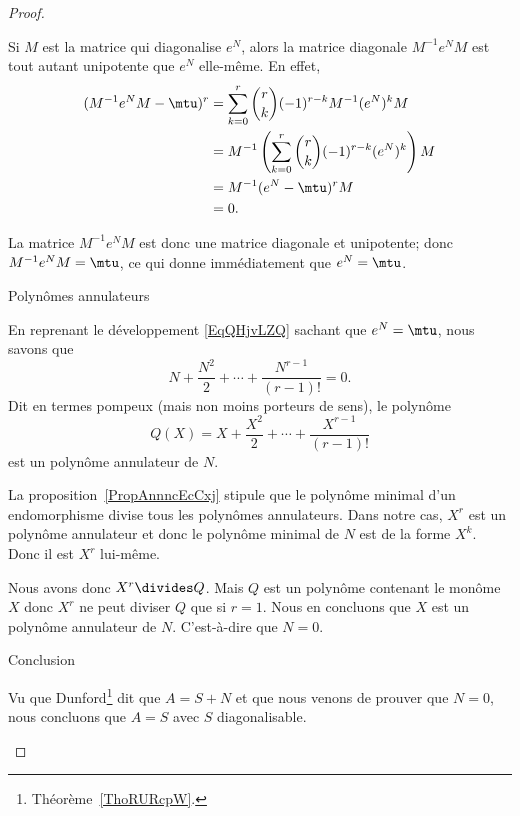 \begin{proof}
\begin{subproof}
		Si \( M\) est la matrice qui diagonalise \( e^N\), alors la matrice diagonale \( M^{-1}e^NM\) est tout autant unipotente que \( e^N\) elle-même. En effet,
		\begin{subequations}
			\begin{align}
				(M^{-1}e^NM-\mtu)^r & =\sum_{k=0}^r\binom{ r }{ k }(-1)^{r-k}M^{-1}(e^N)^kM                \\
				                    & =M^{-1}\left( \sum_{k=0}^r\binom{ r }{ k }(-1)^{r-k}(e^N)^k \right)M \\
				                    & =M^{-1}(e^N-\mtu)^rM                                                 \\
				                    & =0.
			\end{align}
		\end{subequations}

		La matrice \( M^{-1}e^NM\) est donc une matrice diagonale et unipotente; donc \( M^{-1}e^NM=\mtu\), ce qui donne immédiatement que \( e^N=\mtu\).

		\item[Polynômes annulateurs]

		En reprenant le développement \eqref{EqQHjvLZQ} sachant que \( e^N=\mtu\), nous savons que
		\begin{equation}
			N+\frac{ N^2 }{2}+\cdots +\frac{ N^{r-1} }{ (r-1)! }=0.
		\end{equation}
		Dit en termes pompeux (mais non moins porteurs de sens), le polynôme
		\begin{equation}
			Q(X)=X+\frac{ X^2 }{2}+\cdots +\frac{ X^{r-1} }{ (r-1)! }
		\end{equation}
		est un polynôme annulateur de \( N\).

		La proposition~\ref{PropAnnncEcCxj} stipule que le polynôme minimal d'un endomorphisme divise tous les polynômes annulateurs. Dans notre cas, \( X^r\) est un polynôme annulateur et donc le polynôme minimal de \( N\) est de la forme \( X^k\). Donc il est \( X^r\) lui-même.

		Nous avons donc \( X^r\divides Q\). Mais \( Q\) est un polynôme contenant le monôme \( X\) donc \( X^r\) ne peut diviser \( Q\) que si \( r=1\). Nous en concluons que \( X\) est un polynôme annulateur de \( N\). C'est-à-dire que \( N=0\).

		\item[Conclusion]

		Vu que Dunford\footnote{Théorème~\ref{ThoRURcpW}.} dit que \( A=S+N\) et que nous venons de prouver que \( N=0\), nous concluons que \( A=S\) avec \( S\) diagonalisable.

	\end{subproof}
\end{proof}

